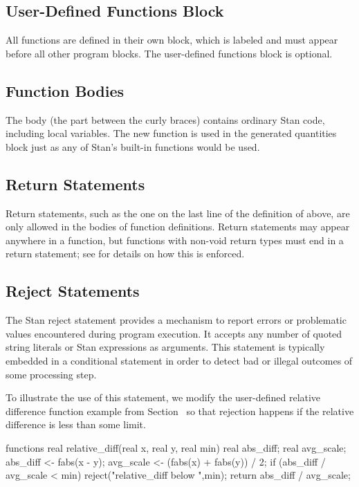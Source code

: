 \subsection{User-Defined Functions Block}

All functions are defined in their own block, which is labeled
 and must appear before all other program blocks.  The
user-defined functions block is optional.

\subsection{Function Bodies}

The body (the part between the curly braces) contains ordinary Stan
code, including local variables.  The new function is used in the
generated quantities block just as any of Stan's built-in functions
would be used.

\subsection{Return Statements}

Return statements, such as the one on the last line of the definition
of  above, are only allowed in the bodies of
function definitions.  Return statements may appear anywhere in a
function, but functions with non-void return types must end in a
return statement; see  for details on how
this is enforced.

\subsection{Reject Statements}

The Stan reject statement provides a mechanism to report errors or problematic
values encountered during program execution.
It accepts any number of quoted string literals or Stan expressions as arguments.
This statement is typically embedded in a conditional statement in order to
detect bad or illegal outcomes of some processing step.

To illustrate the use of this statement, we modify the user-defined
relative difference function example from Section~
so that rejection happens if the relative difference is less than
some limit.
%
\begin{stancode}
functions {
  real relative_diff(real x, real y, real min) {
    real abs_diff;
    real avg_scale;
    abs_diff <- fabs(x - y);
    avg_scale <- (fabs(x) + fabs(y)) / 2;
    if (abs_diff / avg_scale < min) 
      reject("relative_diff below ",min);
    return abs_diff / avg_scale;
  }
}
\end{stancode}


